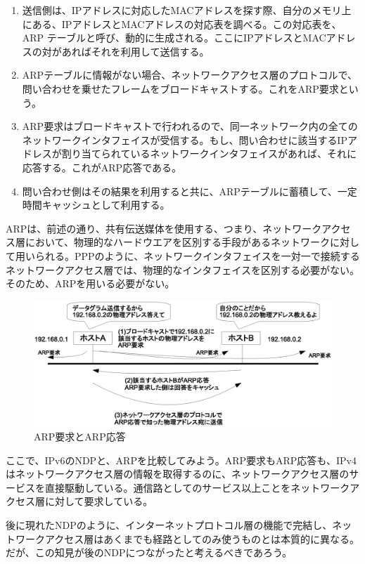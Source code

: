 \begin{enumerate}
\item 送信側は、IPアドレスに対応したMACアドレスを探す際、自分のメモリ上にある、IPアドレスとMACアドレスの対応表を調べる。この対応表を、ARP テーブルと呼び、動的に生成される。ここにIPアドレスとMACアドレスの対があればそれを利用して送信する。
\item ARPテーブルに情報がない場合、ネットワークアクセス層のプロトコルで、問い合わせを乗せたフレームをブロードキャストする。これをARP要求という。
\item ARP要求はブロードキャストで行われるので、同一ネットワーク内の全てのネットワークインタフェイスが受信する。もし、問い合わせに該当するIPアドレスが割り当てられているネットワークインタフェイスがあれば、それに応答する。これがARP応答である。
\item 問い合わせ側はその結果を利用すると共に、ARPテーブルに蓄積して、一定時間キャッシュとして利用する。
\end{enumerate}

ARPは、前述の通り、共有伝送媒体を使用する、つまり、ネットワークアクセス層において、物理的なハードウエアを区別する手段があるネットワークに対して用いられる。PPPのように、ネットワークインタフェイスを一対一で接続するネットワークアクセス層では、物理的なインタフェイスを区別する必要がない。そのため、ARPを用いる必要がない。

\begin{figure}[htbp]
	\includegraphics[width=12cm,clip]{draw/arp.eps}
	\caption{ARP要求とARP応答}
	\label{fig:arp}
\end{figure}

ここで、IPv6のNDPと、ARPを比較してみよう。ARP要求もARP応答も、IPv4はネットワークアクセス層の情報を取得するのに、ネットワークアクセス層のサービスを直接駆動している。通信路としてのサービス以上ことをネットワークアクセス層に対して要求している。

後に現れたNDPのように、インターネットプロトコル層の機能で完結し、ネットワークアクセス層はあくまでも経路としてのみ使うものとは本質的に異なる。だが、この知見が後のNDPにつながったと考えるべきであろう。


